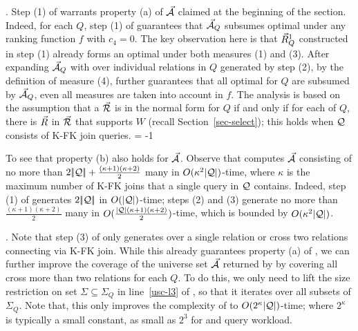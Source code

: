 {\begin{example}\label{exa-usc}
\end{example}




.
Step (1) of \usc warrants property (a) of $\vec{{\mathcal A}}$ claimed at
the beginning of the section. Indeed, for each $Q$, step (1) of
\usc guarantees that $\vec{{\mathcal A}}_{Q}$ subsumes optimal \bdss under
any ranking function $f$ with $c_{4} = 0$. The key observation
here is that $\vec{R}_{Q}^{1}$ constructed in step (1) already forms an
optimal \bds under both measures (1) and (3).
After expanding $\vec{{\mathcal A}}_{Q}$ with \bss over individual relations
in $Q$ generated by step (2), by the definition of measure (4),
\usc further guarantees that all optimal \bdss for $Q$ are subsumed by
$\vec{{\mathcal A}}_{Q}$, even all measures are taken into account in $f$.
The analysis is based on the assumption that a \bds $\vec{{\mathcal R}}$ is
in the normal form for $Q$ if and only if for each \qcs of $Q$, there
is \bs $\vec{R}$ in $\vec{{\mathcal R}}$ that supports $W$ (recall
Section~\ref{sec-select}); this holds when $\mathcal Q$
consists of K-FK join \SPC queries.
\looseness = -1

To see that property (b) also holds
for $\vec{{\mathcal A}}$. Observe that \usc computes $\vec{{\mathcal A}}$ consisting of
no more than $2|\!|{\mathcal Q}|\!| + \frac{(\kappa+1)(\kappa+2)}{2}$
many \bss in $O(\kappa^{2}|{\mathcal Q}|)$-time, where $\kappa$ is the
maximum number of K-FK joins that a single query in $\mathcal Q$
contains. Indeed, step (1) of \usc generates $2|\!|{\mathcal Q}|\!|$ \bss in
$O(|{\mathcal Q}|)$-time; steps (2) and (3) generate no more than
$\frac{(\kappa+1)(\kappa+2)}{2}$ many \bss in
$O(\frac{|{\mathcal Q}|(\kappa+1)(\kappa+2)}{2})$-time, which is bounded
by $O(\kappa^{2}|{\mathcal Q}|)$.


.
Note that step (3) of \usc only generates \bss over a single
relation or cross two relations connecting via K-FK join. While
this already guarantees property (a) of \usc, we can further
improve the coverage of the universe set $\vec{{\mathcal A}}$ returned by
\usc by covering all \bss cross more than two relations for each
$Q$. To do this, we only need to lift the size restriction on set
$\Sigma\subseteq \Sigma_{Q}$ in line~\ref{usc-l3} of \usc, so
that it iterates over all subsets of $\Sigma_{Q}$. Note that,
this only improves the complexity of \usc to
$O(2^{\kappa}|{\mathcal Q}|)$-time; where $2^{\kappa}$ is typically a
small constant, \eg as small as $2^{3}$ for \tpch and \tpcds
query workload.}%
